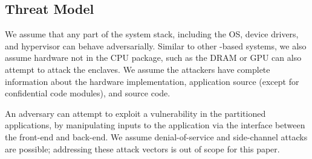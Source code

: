 







\subsection{Threat Model}


We assume that any part of the system stack, including the OS,
device drivers, and hypervisor can behave adversarially.
Similar to other \sgx{}-based systems, we also assume 
hardware not in the CPU package, such as the DRAM or GPU 
can also attempt to attack the enclaves.
We assume the attackers have complete information
about the \sgx{} hardware implementation, application source (except for confidential code modules), and \sysname{} source code.

An adversary can attempt to
exploit a vulnerability in the partitioned applications,
by manipulating inputs to the application via the interface between the
front-end and back-end.
We assume denial-of-service and side-channel attacks are possible; 
addressing these attack vectors is out of scope for this paper.



